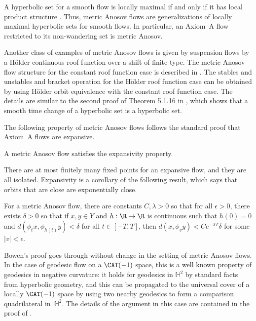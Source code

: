 A hyperbolic set for a smooth flow is locally maximal if and only if it has local product structure \cite[Th.\,6.2.7]{FH}. Thus, metric Anosov flows are generalizations of locally maximal hyperbolic sets for smooth flows. In particular, an Axiom~A flow restricted to its non-wandering set is metric Anosov.

Another class of examples of metric Anosov flows is given by suspension flows by a Hölder continuous roof function over a shift of finite type. The metric Anosov flow structure for the constant roof function case is described in \cite{pollicott}. The stables and unstables and bracket operation for the Hölder roof function case can be obtained by using Hölder orbit equivalence with the constant roof function case. The details are similar to the second proof of Theorem 5.1.16 in \cite[\S6.1]{FH}, which shows that a smooth time change of a hyperbolic set is a hyperbolic set.

The following property of metric Anosov flows follows the standard proof that Axiom~A flows are expansive.
\begin{thm}
A metric Anosov flow satisfies the expansivity property.
\end{thm}
There are at most finitely many fixed points for an expansive flow, and they are all isolated. Expansivity is a corollary of the following result, which says that orbits that are close are exponentially close.

\begin{thm}\label{expclose}
For a metric Anosov flow, there are constants $C, \lambda>0$ so that for all $\epsilon>0$, there exists $\delta>0$ so that if $x,y \in Y$ and \hbox{$h: \R \to \R$} is continuous such that $h(0)=0$ and $d(\phi_t x, \phi_{h(t)} y) < \delta$ for all $t \in [-T, T]$, then $d(x, \phi_v y)< C e^{-\lambda T}\delta$ for some $|v| < \epsilon$.
\end{thm}

Bowen's proof goes through without change in the setting of metric Anosov flows. In the case of geodesic flow on a $\CAT(-1)$ space, this is a well known property of geodesics in negative curvature: it holds for geodesics in $\mathbb{H}^2$ by standard facts from hyperbolic geometry, and this can be propagated to the universal cover of a locally $\CAT(-1)$ space by using two nearby geodesics to form a comparison quadrilateral in~$\mathbb{H}^2$. The details of the argument in this case are contained in the proof of \cite[Prop.\,4.3]{CLT}.

